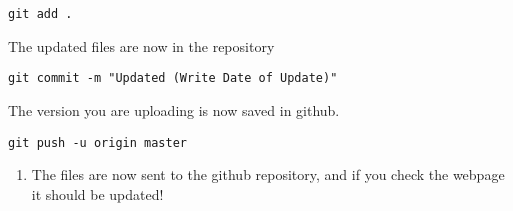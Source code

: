 \documentclass[
]{book}
\providecommand{\tightlist}{%
  \setlength{\itemsep}{0pt}\setlength{\parskip}{0pt}}
\begin{document}
\begin{verbatim}
git add .
\end{verbatim}

The updated files are now in the repository

\begin{verbatim}
git commit -m "Updated (Write Date of Update)"
\end{verbatim}

The version you are uploading is now saved in github.

\begin{verbatim}
git push -u origin master
\end{verbatim}

\begin{enumerate}
\def\labelenumi{\arabic{enumi}.}
\setcounter{enumi}{6}
\tightlist
\item
  The files are now sent to the github repository, and if you check the webpage it should be updated!
\end{enumerate}
\end{document}
